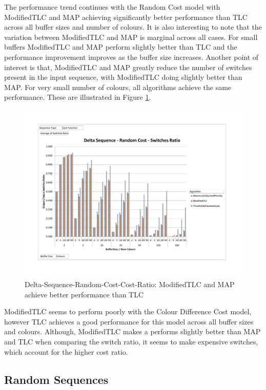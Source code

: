 The performance trend continues with the Random Cost model with ModifiedTLC and MAP achieving significantly better performance than TLC across all buffer sizes and number of colours. It is also interesting to note that the variation between ModifiedTLC and MAP is marginal across all cases. For small buffers ModifiedTLC and MAP perform slightly better than TLC and the performance improvement improves as the buffer size increases. Another point of interest is that, ModifiedTLC and MAP greatly reduce the number of switches present in the input sequence, with ModifiedTLC doing slightly better than MAP. For very small number of colours, all algorithms achieve the same performance. These are illustrated in Figure \ref{DeltaSeqRandomCost}.

\begin{figure}[ht]
\centering 
\includegraphics[scale=0.60]{Delta-Seq-Random-Cost-Switches.pdf}
\caption{Delta-Sequence-Random-Cost-Cost-Ratio: ModifiedTLC and MAP achieve better performance than TLC}
\label{DeltaSeqRandomCost}
\end{figure}

ModifiedTLC seems to perform poorly with the Colour Difference Cost model, however TLC achieves a good performance for this model across all buffer sizes and colours. Although, ModifiedTLC makes a performs slightly better than MAP and TLC when comparing the switch ratio, it seems to make expensive switches, which account for the higher cost ratio.

\subsection{Random Sequences}

